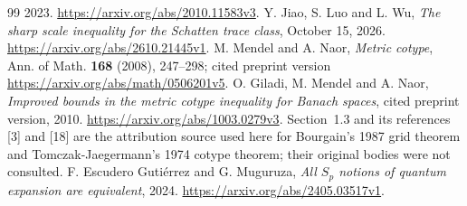 \documentclass[11pt]{article}
\theoremstyle{remark}\newtheorem{remark}[theorem]{Remark}
\numberwithin{equation}{section}
\begin{document}
\begin{thebibliography}{99}
2023. \url{https://arxiv.org/abs/2010.11583v3}.
 Y. Jiao, S. Luo and L. Wu, \emph{The sharp scale inequality
for the Schatten trace class}, October 15, 2026.
\url{https://arxiv.org/abs/2610.21445v1}.
 M. Mendel and A. Naor, \emph{Metric cotype}, Ann. of Math.
\textbf{168} (2008), 247--298; cited preprint version
\url{https://arxiv.org/abs/math/0506201v5}.
 O. Giladi, M. Mendel and A. Naor, \emph{Improved bounds
in the metric cotype inequality for Banach spaces}, cited preprint version,
2010. \url{https://arxiv.org/abs/1003.0279v3}.
Section~1.3 and its references [3] and [18] are the attribution source
used here for Bourgain's 1987 grid theorem and Tomczak-Jaegermann's
1974 cotype theorem; their original bodies were not consulted.
 F. Escudero Guti\'errez and G. Muguruza,
\emph{All $S_p$ notions of quantum expansion are equivalent}, 2024.
\url{https://arxiv.org/abs/2405.03517v1}.
\end{thebibliography}
\end{document}
